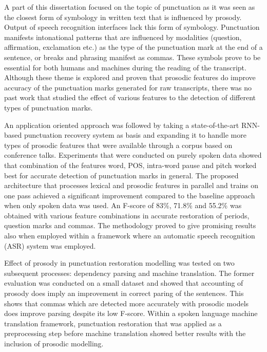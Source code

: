 A part of this dissertation focused on the topic of punctuation as it was seen as the closest form of symbology in written text that is influenced by prosody. Output of speech recognition interfaces lack this form of symbology. Punctuation manifests intonational patterns that are influenced by modalities (question, affirmation, exclamation etc.) as the type of the punctuation mark at the end of a sentence, or breaks and phrasing manifest as commas. These symbols prove to be essential for both humans and machines during the reading of the transcript. Although these theme is explored and proven that prosodic features do improve accuracy of the punctuation marks generated for raw transcripts, there was no past work that studied the effect of various features to the detection of different types of punctuation marks. 

An application oriented approach was followed by taking a state-of-the-art RNN-based punctuation recovery system as basis and expanding it to handle more types of prosodic features that were available through a corpus based on conference talks. Experiments that were conducted on purely spoken data showed that combination of the features word, POS, intra-word pause and pitch worked best for accurate detection of punctuation marks in general. The proposed architecture that processes lexical and prosodic features in parallel and trains on one pass achieved a significant improvement compared to the baseline approach when only spoken data was used. An F-score of 83\%, 71.8\% and 55.2\% was obtained with various feature combinations in accurate restoration of periods, question marks and commas. The methodology proved to give promising results also when employed within a framework where an automatic speech recognition (ASR) system was employed. 

Effect of prosody in punctuation restoration modelling was tested on two subsequent processes: dependency parsing and machine translation. The former evaluation was conducted on a small dataset and showed that accounting of prosody does imply an improvement in correct paring of the sentences. This shows that commas which are detected more accurately with prosodic models does improve parsing despite its low F-score. Within a spoken language machine translation framework, punctuation restoration that was applied as a preprocessing step before machine translation showed better results with the inclusion of prosodic modelling. 

